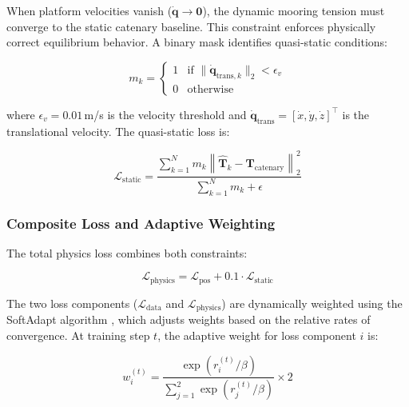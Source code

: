 \documentclass[preprint,12pt]{elsarticle}
\begin{document}
When platform velocities vanish ($\dot{\mathbf{q}} \to \mathbf{0}$), the dynamic mooring tension must converge to the static catenary baseline. This constraint enforces physically correct equilibrium behavior. A binary mask identifies quasi-static conditions:

\begin{equation}
\label{eq:static_mask}
    m_k = \begin{cases}
        1 & \text{if } \|\dot{\mathbf{q}}_{\text{trans},k}\|_2 < \epsilon_v \\
        0 & \text{otherwise}
    \end{cases}
\end{equation}

\noindent where $\epsilon_v = 0.01$\,m/s is the velocity threshold and $\dot{\mathbf{q}}_{\text{trans}} = [\dot{x}, \dot{y}, \dot{z}]^\top$ is the translational velocity. The quasi-static loss is:

\begin{equation}
\label{eq:static_loss}
    \mathcal{L}_{\text{static}} = \frac{\sum_{k=1}^{N} m_k \left\| \hat{\mathbf{T}}_k - \mathbf{T}_{\text{catenary}} \right\|_2^2}{\sum_{k=1}^{N} m_k + \epsilon}
\end{equation}

\subsubsection{Composite Loss and Adaptive Weighting}

The total physics loss combines both constraints:

\begin{equation}
\label{eq:physics_total}
    \mathcal{L}_{\text{physics}} = \mathcal{L}_{\text{pos}} + 0.1 \cdot \mathcal{L}_{\text{static}}
\end{equation}

The two loss components ($\mathcal{L}_{\text{data}}$ and $\mathcal{L}_{\text{physics}}$) are dynamically weighted using the SoftAdapt algorithm \cite{heiss2019softadapt}, which adjusts weights based on the relative rates of convergence. At training step $t$, the adaptive weight for loss component $i$ is:

\begin{equation}
\label{eq:softadapt}
    w_i^{(t)} = \frac{\exp\!\left(r_i^{(t)} / \beta\right)}{\displaystyle\sum_{j=1}^{2} \exp\!\left(r_j^{(t)} / \beta\right)} \times 2
\end{equation}
\end{document}
